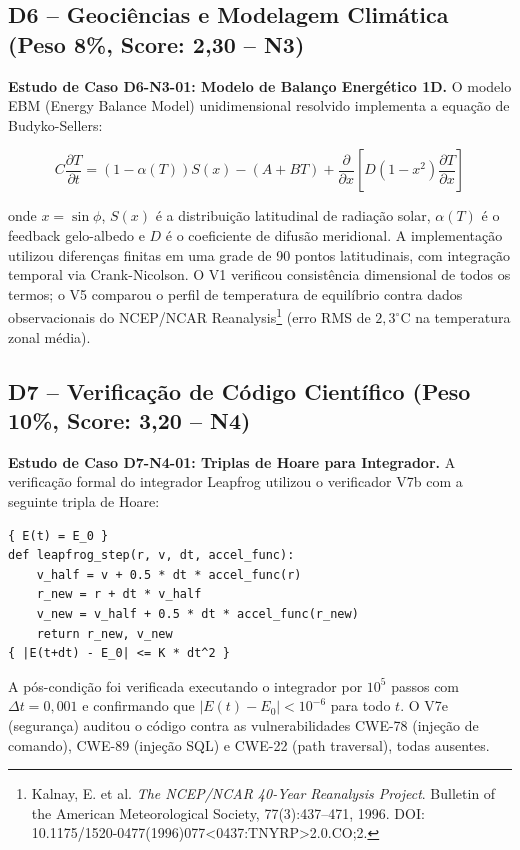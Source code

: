 \subsection{D6 -- Geociências e Modelagem Climática (Peso 8\%, Score: 2,30 -- N3)}

\textbf{Estudo de Caso D6-N3-01: Modelo de Balanço Energético 1D.} O
modelo EBM (Energy Balance Model) unidimensional resolvido implementa a
equação de Budyko-Sellers:

\begin{equation}
C\frac{\partial T}{\partial t} = (1 - \alpha(T))S(x) - (A + BT) + \frac{\partial}{\partial x}\left[D(1-x^2)\frac{\partial T}{\partial x}\right]
\end{equation}

onde $x = \sin\phi$, $S(x)$ é a distribuição latitudinal de radiação
solar, $\alpha(T)$ é o feedback gelo-albedo e $D$ é o coeficiente de
difusão meridional. A implementação utilizou diferenças finitas em uma
grade de 90 pontos latitudinais, com integração temporal via
Crank-Nicolson. O V1 verificou consistência dimensional de todos os
termos; o V5 comparou o perfil de temperatura de equilíbrio contra
dados observacionais do NCEP/NCAR Reanalysis\footnote{Kalnay, E. et al.
\textit{The NCEP/NCAR 40-Year Reanalysis Project}. Bulletin of the
American Meteorological Society, 77(3):437--471, 1996. DOI:
10.1175/1520-0477(1996)077<0437:TNYRP>2.0.CO;2.} (erro RMS de
$2{,}3^\circ$C na temperatura zonal média).

\subsection{D7 -- Verificação de Código Científico (Peso 10\%, Score: 3,20 -- N4)}

\textbf{Estudo de Caso D7-N4-01: Triplas de Hoare para Integrador.} A
verificação formal do integrador Leapfrog utilizou o verificador V7b
com a seguinte tripla de Hoare:

\begin{verbatim}
{ E(t) = E_0 }
def leapfrog_step(r, v, dt, accel_func):
    v_half = v + 0.5 * dt * accel_func(r)
    r_new = r + dt * v_half
    v_new = v_half + 0.5 * dt * accel_func(r_new)
    return r_new, v_new
{ |E(t+dt) - E_0| <= K * dt^2 }
\end{verbatim}

A pós-condição foi verificada executando o integrador por $10^5$ passos
com $\Delta t = 0{,}001$ e confirmando que $|E(t) - E_0| < 10^{-6}$ para
todo $t$. O V7e (segurança) auditou o código contra as vulnerabilidades
CWE-78 (injeção de comando), CWE-89 (injeção SQL) e CWE-22 (path
traversal), todas ausentes.

